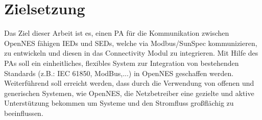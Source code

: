\newpage
\section{Zielsetzung}\label{sub:Zielsetzung}
Das Ziel dieser Arbeit ist es, einen \acl{PA} für die Kommunikation zwischen OpenNES fähigen
\ac{IED}s und \ac{SED}s, welche via Modbus/SunSpec kommunizieren, zu entwickeln und diesen in das Connectivity Modul zu integrieren.
Mit Hilfe des \acl{PA}s soll ein einheitliches, flexibles System zur Integration von bestehenden Standards (z.B.: IEC 61850, ModBus,...) in OpenNES geschaffen werden.
Weiterführend soll erreicht werden, dass durch die Verwendung von offenen und generischen Systemen, wie OpenNES, die Netzbetreiber eine gezielte und aktive Unterstützung bekommen um Systeme und den Stromfluss großflächig zu beeinflussen.








